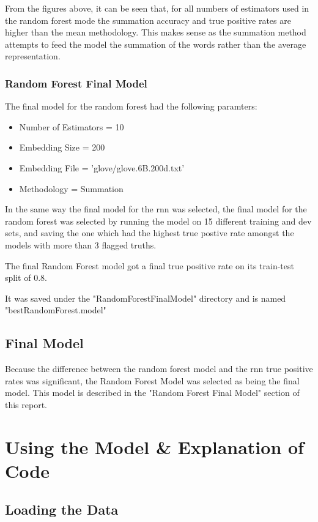 \documentclass[twoside,twocolumn]{article}
\begin{document}
From the figures above, it can be seen that, for all numbers of estimators used in the
random forest mode the summation accuracy and true positive rates are higher than the mean
methodology. This makes sense as the summation method attempts to feed the model the summation
of the words rather than the average representation.

\subsubsection{Random Forest Final Model}

The final model for the random forest had the following paramters:

\begin{itemize}
\item Number of Estimators = 10
\item Embedding Size = 200
\item Embedding File = 'glove/glove.6B.200d.txt'
\item Methodology = Summation 
\end{itemize}

In the same way the final model for the rnn was selected, the final model for the random forest was
selected by running the model on 15 different training and dev sets, and saving the one which had the
highest true postive rate amongst the models with more than 3 flagged truths.

The final Random Forest model got a final true positive rate on its train-test split of 0.8.

It was saved under the "RandomForestFinalModel" directory and is named "bestRandomForest.model"

\subsection{Final Model}

Because the difference between the random forest model and the rnn true positive rates was significant,
the Random Forest Model was selected as being the final model. This model is described in the "Random Forest Final Model"
section of this report.


\section{Using the Model & Explanation of Code}

\subsection{Loading the Data}
\end{document}
